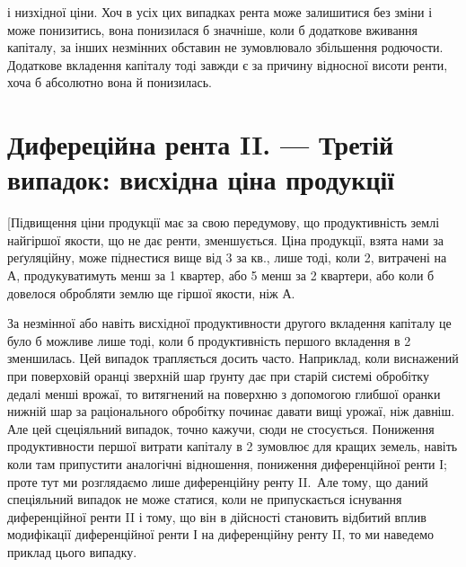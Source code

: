 \parcont{}  %
і низхідної ціни. Хоч в усіх цих випадках рента може залишитися без зміни
і може понизитись, вона понизилася б значніше, коли б додаткове вживання
капіталу, за інших незмінних обставин не зумовлювало збільшення родючости. Додаткове вкладення
капіталу тоді завжди є за причину відносної висоти ренти,
хоча б абсолютно вона й понизилась.

\section{Дифереційна рента II. — Третій випадок:
висхідна ціна продукції}

[Підвищення ціни продукції має за свою передумову, що продуктивність землі
найгіршої якости, що не дає ренти, зменшується. Ціна продукції, взята нами за
реґуляційну, може піднестися вище від 3 за кв., лише тоді, коли 2,
витрачені на $А$, продукуватимуть менш за 1 квартер, або 5 менш за
2 квартери, або коли б довелося обробляти землю ще гіршої якости, ніж $А$.

За незмінної або навіть висхідної продуктивности другого вкладення капіталу
це було б можливе лише тоді, коли б продуктивність першого вкладення в 2
зменшилась. Цей випадок трапляється досить часто. Наприклад, коли виснажений
при поверховій оранці зверхній шар ґрунту дає при старій системі обробітку
дедалі менші врожаї, то витягнений на поверхню з допомогою глибшої
оранки нижній шар за раціонального обробітку починає давати вищі
урожаї, ніж давніш. Але цей сцеціяльний випадок, точно кажучи, сюди не
стосується. Пониження продуктивности першої витрати капіталу в 2 зумовлює для кращих
земель, навіть коли там припустити аналогічні відношення,
пониження диференційної ренти І; проте тут ми розглядаємо лише диференційну
ренту II.~Але тому, що даний спеціяльний випадок не може статися, коли не
припускається існування диференційної ренти II і тому, що він в дійсності
становить відбитий вплив модифікації диференційної ренти І на диференційну
ренту II, то ми наведемо приклад цього випадку.

